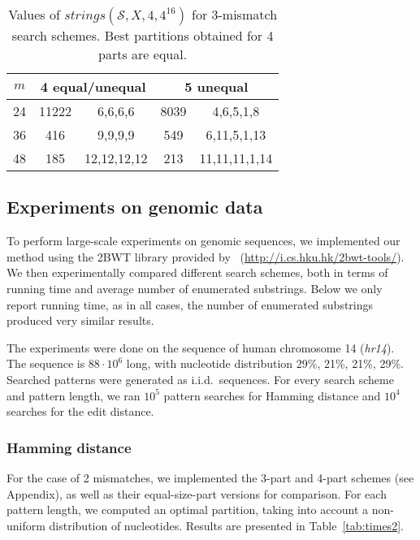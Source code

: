 \documentclass[12pt]{article}
\newcommand{\scheme}{\mathcal{S}}
\newcommand{\partition}{X}
\newcommand{\numstrings}{\mathit{strings}}
\begin{document}
\begin{table}[!tb]
\caption{Values of $\numstrings(\scheme,\partition,4,4^{16})$ for $3$-mismatch
search schemes. Best partitions obtained for 4 parts are equal.\label{tab:k3}}
\centering
\begin{tabular}{|c|c|c|c|c|}
\hline
$m$ & \multicolumn{2}{|c|}{4 equal/unequal} & \multicolumn{2}{|c|}{5 unequal} \\
\hline
24 & 11222 & 6,6,6,6 &  8039 & 4,6,5,1,8 \\
36 &   416 & 9,9,9,9 &   549 & 6,11,5,1,13 \\
48 &   185 & 12,12,12,12 &   213 & 11,11,11,1,14 \\
\hline
\end{tabular}
\end{table}

\subsection{Experiments on genomic data}\label{subsec:experimentpract}

To perform large-scale experiments on genomic sequences, we
implemented our method using the {\sc 2BWT} library
provided by~\cite{LamLTWWY09}
(\url{http://i.cs.hku.hk/2bwt-tools/}). We then experimentally compared
different search schemes, both in terms of running time and average
number of enumerated substrings. Below we only report 
running time, as in all cases, the number of enumerated substrings
produced very similar results. 

\begin{sloppypar}
The experiments were done on the sequence of human chromosome
14 (\emph{hr14}). The sequence is $88\cdot 10^6$ long, with nucleotide distribution
29\%, 21\%, 21\%, 29\%.
Searched patterns were generated as i.i.d.\ sequences. For every search
scheme and pattern length, we ran $10^5$ pattern searches for Hamming distance
and $10^4$ searches for the edit distance.
\end{sloppypar}

\subsubsection{Hamming distance}

For the case of 2 mismatches, we implemented the 3-part and 4-part schemes
(see Appendix), as well as their equal-size-part
versions for comparison. For each pattern length, we computed an
optimal partition, taking into account a non-uniform distribution of
nucleotides. Results are presented in Table~\ref{tab:times2}.
\end{document}
